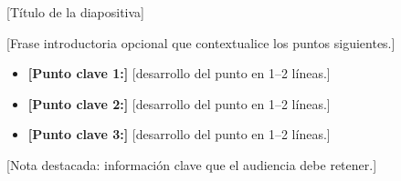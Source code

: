 \documentclass[aspectratio=169, 12pt]{beamer}
\begin{document}
\begin{frame}{[Título de la diapositiva]}

  \hspace{0.55cm}
  \begin{minipage}{0.88\textwidth}
    {[}Frase introductoria opcional que contextualice los puntos siguientes.{]}
    \vspace{0.4em}
    \begin{itemize}
      \item \textbf{[Punto clave 1:]} {[}desarrollo del punto en 1--2 líneas.{]}
      \item \textbf{[Punto clave 2:]} {[}desarrollo del punto en 1--2 líneas.{]}
      \item \textbf{[Punto clave 3:]} {[}desarrollo del punto en 1--2 líneas.{]}
    \end{itemize}

    \vspace{0.5em}
    \begin{tcolorbox}[cajaNota, top=3pt, bottom=3pt]
      {[}Nota destacada: información clave que el audiencia debe retener.{]}
    \end{tcolorbox}
  \end{minipage}
\end{frame}
\end{document}
